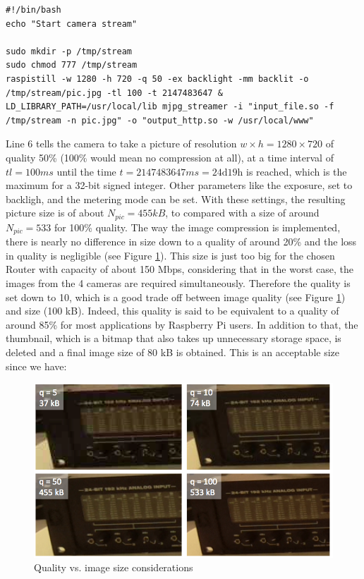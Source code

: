 \begin{center}
\begin{minipage}{0.9\linewidth}
\begin{lstlisting}[caption=$\sim\hspace{-0.5em}/start\_camera.sh$, label=startcamera, frame=none]
#!/bin/bash
echo "Start camera stream"

sudo mkdir -p /tmp/stream
sudo chmod 777 /tmp/stream
raspistill -w 1280 -h 720 -q 50 -ex backlight -mm backlit -o /tmp/stream/pic.jpg -tl 100 -t 2147483647 &
LD_LIBRARY_PATH=/usr/local/lib mjpg_streamer -i "input_file.so -f /tmp/stream -n pic.jpg" -o "output_http.so -w /usr/local/www"
\end{lstlisting}
\end{minipage}
\end{center}

Line 6 tells the camera to take a picture of resolution $w \times h = 1280 \times 720$ of quality 50\% (100\% would mean no compression at all), at a time interval of $tl = 100ms$ until the time $t = 2147483647ms = 24 \text{d} 19 \text{h}$ is reached, which is the maximum for a 32-bit signed integer.
Other parameters like the exposure, set to backligh, and the metering mode can be set. 
With these settings, the resulting picture size is of about $N_{pic}=455kB$, to compared with a size of around $N_{pic}=533$ for 100\% quality. The way the image compression is implemented, there is nearly no difference in size down to a quality of around 20\% and the loss in quality is negligible (see Figure \ref{fig:quality}).
This size is just too big for the chosen Router with capacity of about 150 Mbps, considering that in the worst case, the images from the 4 cameras are required simultaneously. Therefore the quality is set down to 10, which is a good trade off between image quality (see Figure \ref{fig:quality}) and size (100 kB). Indeed, this quality is said to be equivalent to a quality of around 85\% for most applications by Raspberry Pi users. %
In addition to that, the thumbnail, which is a bitmap that also takes up unnecessary storage space, is deleted and a final image size of 80 kB is obtained. This is an acceptable size since we have:

\begin{figure}[H]
    \centering
    \includegraphics[width=\linewidth]{files/quality.png}
    \caption{Quality vs. image size considerations}
    \label{fig:quality}
\end{figure}

